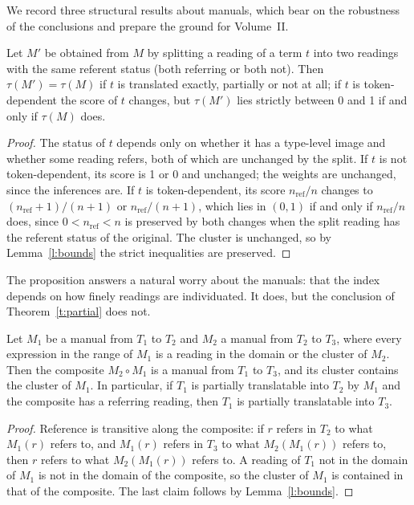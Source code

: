 \documentclass{situationist-preprint}
\begin{document}
We record three structural results about manuals, which bear on the robustness of the conclusions and prepare the ground for Volume~II.

\begin{proposition}\label{p:refine}
Let $M'$ be obtained from $M$ by splitting a reading of a term $t$ into two readings with the same referent status (both referring or both not). Then $\tau(M') = \tau(M)$ if $t$ is translated exactly, partially or not at all; if $t$ is token-dependent the score of $t$ changes, but $\tau(M')$ lies strictly between 0 and 1 if and only if $\tau(M)$ does.
\end{proposition}

\begin{proof}
The status of $t$ depends only on whether it has a type-level image and whether some reading refers, both of which are unchanged by the split. If $t$ is not token-dependent, its score is 1 or 0 and unchanged; the weights are unchanged, since the inferences are. If $t$ is token-dependent, its score $n_{\mathrm{ref}}/n$ changes to $(n_{\mathrm{ref}}+1)/(n+1)$ or $n_{\mathrm{ref}}/(n+1)$, which lies in $(0,1)$ if and only if $n_{\mathrm{ref}}/n$ does, since $0 < n_{\mathrm{ref}} < n$ is preserved by both changes when the split reading has the referent status of the original. The cluster is unchanged, so by Lemma~\ref{l:bounds} the strict inequalities are preserved.
\end{proof}

The proposition answers a natural worry about the manuals: that the index depends on how finely readings are individuated. It does, but the conclusion of Theorem~\ref{t:partial} does not.

\begin{proposition}[Composition]\label{p:compose}
Let $M_1$ be a manual from $T_1$ to $T_2$ and $M_2$ a manual from $T_2$ to $T_3$, where every expression in the range of $M_1$ is a reading in the domain or the cluster of $M_2$. Then the composite $M_2 \circ M_1$ is a manual from $T_1$ to $T_3$, and its cluster contains the cluster of $M_1$. In particular, if $T_1$ is partially translatable into $T_2$ by $M_1$ and the composite has a referring reading, then $T_1$ is partially translatable into $T_3$.
\end{proposition}

\begin{proof}
Reference is transitive along the composite: if $r$ refers in $T_2$ to what $M_1(r)$ refers to, and $M_1(r)$ refers in $T_3$ to what $M_2(M_1(r))$ refers to, then $r$ refers to what $M_2(M_1(r))$ refers to. A reading of $T_1$ not in the domain of $M_1$ is not in the domain of the composite, so the cluster of $M_1$ is contained in that of the composite. The last claim follows by Lemma~\ref{l:bounds}.
\end{proof}
\end{document}
